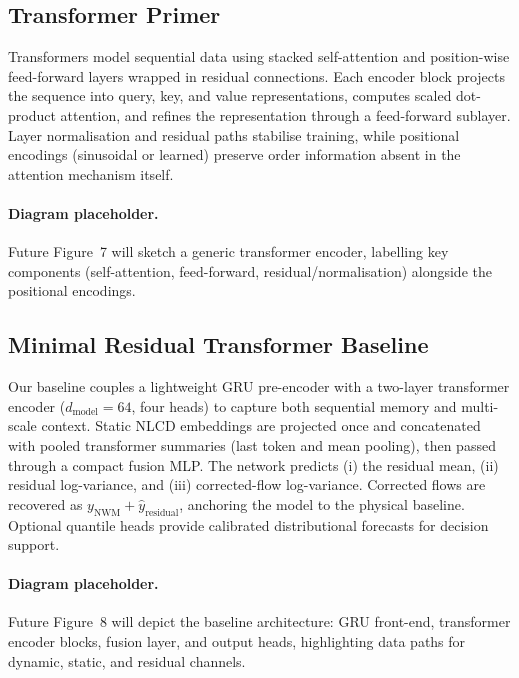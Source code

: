\documentclass[draft]{agujournal2019}
\begin{document}
\subsection{Transformer Primer}
Transformers model sequential data using stacked self-attention and position-wise feed-forward layers wrapped in residual connections. Each encoder block projects the sequence into query, key, and value representations, computes scaled dot-product attention, and refines the representation through a feed-forward sublayer. Layer normalisation and residual paths stabilise training, while positional encodings (sinusoidal or learned) preserve order information absent in the attention mechanism itself.

\paragraph{Diagram placeholder.} Future Figure~7 will sketch a generic transformer encoder, labelling key components (self-attention, feed-forward, residual/normalisation) alongside the positional encodings.

\subsection{Minimal Residual Transformer Baseline}
Our baseline couples a lightweight GRU pre-encoder with a two-layer transformer encoder (\(d_\text{model}=64\), four heads) to capture both sequential memory and multi-scale context. Static NLCD embeddings are projected once and concatenated with pooled transformer summaries (last token and mean pooling), then passed through a compact fusion MLP. The network predicts (i) the residual mean, (ii) residual log-variance, and (iii) corrected-flow log-variance. Corrected flows are recovered as \(y_{\text{NWM}} + \hat{y}_{\text{residual}}\), anchoring the model to the physical baseline. Optional quantile heads provide calibrated distributional forecasts for decision support.

\paragraph{Diagram placeholder.} Future Figure~8 will depict the baseline architecture: GRU front-end, transformer encoder blocks, fusion layer, and output heads, highlighting data paths for dynamic, static, and residual channels.
\end{document}
